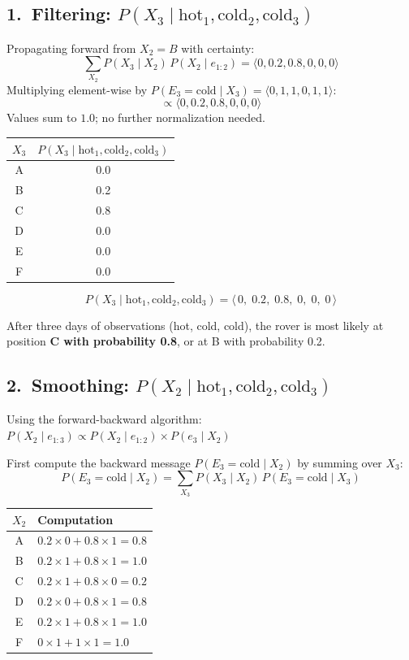 \documentclass[12pt]{article}
\begin{document}
\subsection*{1.\ Filtering: $P(X_3\mid\text{hot}_1,\text{cold}_2,\text{cold}_3)$}

Propagating forward from $X_2=B$ with certainty:
\[
\sum_{X_2}P(X_3\mid X_2)\,P(X_2\mid e_{1:2})
=\langle0,0.2,0.8,0,0,0\rangle
\]
Multiplying element-wise by $P(E_3{=}\text{cold}\mid X_3)=\langle0,1,1,0,1,1\rangle$:
\[
\propto\langle0,0.2,0.8,0,0,0\rangle
\]
Values sum to $1.0$; no further normalization needed.

\begin{center}
\begin{tabular}{cc}
\toprule
$X_3$ & $P(X_3\mid\text{hot}_1,\text{cold}_2,\text{cold}_3)$\\
\midrule
A & 0.0\\ B & 0.2\\ C & 0.8\\ D & 0.0\\ E & 0.0\\ F & 0.0\\
\bottomrule
\end{tabular}
\end{center}
\[
\boxed{P(X_3\mid\text{hot}_1,\text{cold}_2,\text{cold}_3)
=\langle\,0,\;0.2,\;0.8,\;0,\;0,\;0\,\rangle}
\]

After three days of observations (hot, cold, cold), the rover is most likely at
position \textbf{C with probability 0.8}, or at B with probability 0.2.

\subsection*{2.\ Smoothing: $P(X_2\mid\text{hot}_1,\text{cold}_2,\text{cold}_3)$}

Using the forward-backward algorithm:
$P(X_2\mid e_{1:3})\propto P(X_2\mid e_{1:2})\times P(e_3\mid X_2)$

First compute the backward message $P(E_3{=}\text{cold}\mid X_2)$ by summing over $X_3$:
\[
P(E_3{=}\text{cold}\mid X_2)=\sum_{X_3}P(X_3\mid X_2)\,P(E_3{=}\text{cold}\mid X_3)
\]

\begin{center}
\begin{tabular}{cl}
\toprule
$X_2$ & Computation\\
\midrule
A & $0.2\times0+0.8\times1=0.8$\\
B & $0.2\times1+0.8\times1=1.0$\\
C & $0.2\times1+0.8\times0=0.2$\\
D & $0.2\times0+0.8\times1=0.8$\\
E & $0.2\times1+0.8\times1=1.0$\\
F & $0\times1+1\times1=1.0$\\
\bottomrule
\end{tabular}
\end{center}
\end{document}
